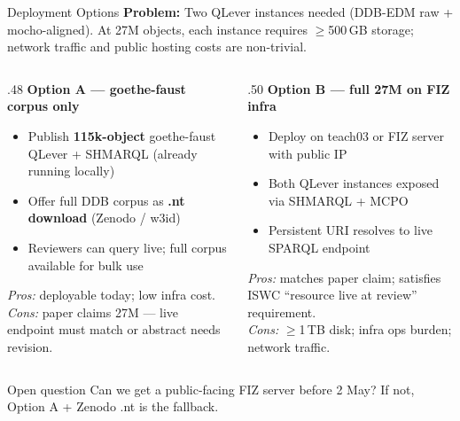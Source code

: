 \documentclass[xcolor,aspectratio=169,compress]{beamer}
\begin{document}
\begin{frame}[shrink=5]{Deployment Options}
  \small
  \textbf{Problem:} Two QLever instances needed (DDB-EDM raw + mocho-aligned).
  At 27M objects, each instance requires $\geq$500\,GB storage;
  network traffic and public hosting costs are non-trivial.

  \smallskip
  \begin{columns}[t]
    \begin{column}{.48\textwidth}
      \textbf{Option A --- goethe-faust corpus only}
      \begin{itemize}\setlength{\itemsep}{2pt}
        \item Publish \textbf{115k-object} goethe-faust QLever + SHMARQL (already running locally)
        \item Offer full DDB corpus as \textbf{.nt download} (Zenodo / w3id)
        \item Reviewers can query live; full corpus available for bulk use
      \end{itemize}
      \smallskip
      \textit{Pros:} deployable today; low infra cost. \\
      \textit{Cons:} paper claims 27M --- live endpoint must match or abstract needs revision.
    \end{column}
    \begin{column}{.50\textwidth}
      \textbf{Option B --- full 27M on FIZ infra}
      \begin{itemize}\setlength{\itemsep}{2pt}
        \item Deploy on teach03 or FIZ server with public IP
        \item Both QLever instances exposed via SHMARQL + MCPO
        \item Persistent URI resolves to live SPARQL endpoint
      \end{itemize}
      \smallskip
      \textit{Pros:} matches paper claim; satisfies ISWC ``resource live at review'' requirement. \\
      \textit{Cons:} $\geq$1\,TB disk; infra ops burden; network traffic.
    \end{column}
  \end{columns}
  \begin{alertblock}{Open question}
    \small Can we get a public-facing FIZ server before 2 May?
    If not, Option A + Zenodo .nt is the fallback.
  \end{alertblock}
\end{frame}
\end{document}
